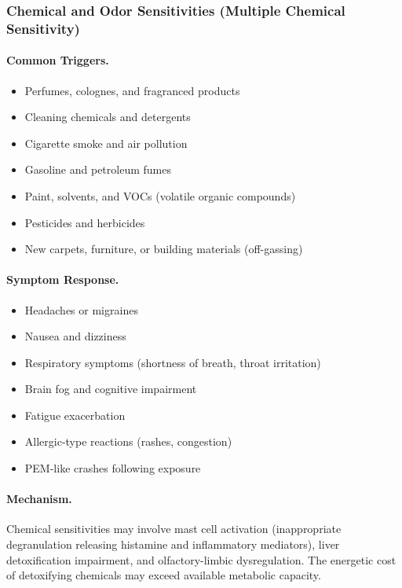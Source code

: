 \subsubsection{Chemical and Odor Sensitivities (Multiple Chemical Sensitivity)}

\paragraph{Common Triggers.}
\begin{itemize}
    \item Perfumes, colognes, and fragranced products
    \item Cleaning chemicals and detergents
    \item Cigarette smoke and air pollution
    \item Gasoline and petroleum fumes
    \item Paint, solvents, and VOCs (volatile organic compounds)
    \item Pesticides and herbicides
    \item New carpets, furniture, or building materials (off-gassing)
\end{itemize}

\paragraph{Symptom Response.}
\begin{itemize}
    \item Headaches or migraines
    \item Nausea and dizziness
    \item Respiratory symptoms (shortness of breath, throat irritation)
    \item Brain fog and cognitive impairment
    \item Fatigue exacerbation
    \item Allergic-type reactions (rashes, congestion)
    \item PEM-like crashes following exposure
\end{itemize}

\paragraph{Mechanism.}
Chemical sensitivities may involve mast cell activation (inappropriate degranulation releasing histamine and inflammatory mediators), liver detoxification impairment, and olfactory-limbic dysregulation. The energetic cost of detoxifying chemicals may exceed available metabolic capacity.


